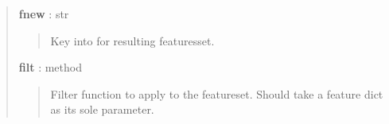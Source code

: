 \documentclass[letterpaper,10pt,english]{sphinxmanual}
\begin{document}
\begin{fulllineitems}
\begin{fulllineitems}
\begin{quote}
\begin{description}
\textbf{fnew} : str
\begin{quote}

Key into  for resulting featuresset.
\end{quote}

\textbf{filt} : method
\begin{quote}

Filter function to apply to the featureset. Should take a feature
dict as its sole parameter.
\end{quote}

\end{description}\end{quote}

\end{fulllineitems}


\end{fulllineitems}

\end{document}
